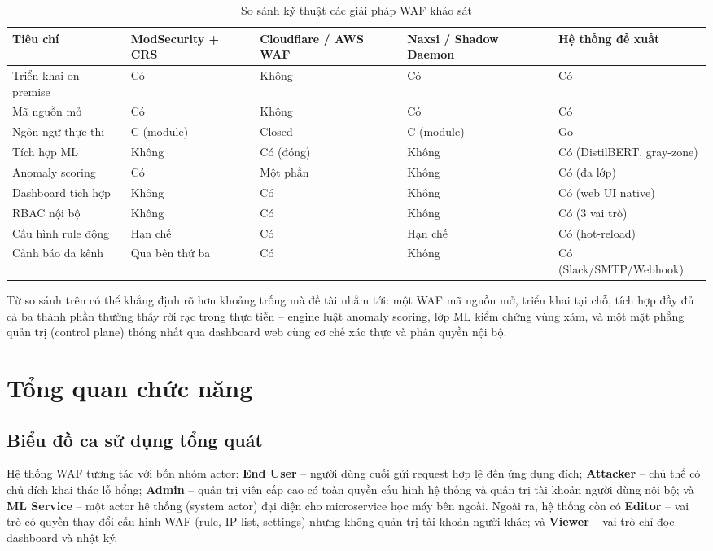 \documentclass[../DoAn.tex]{subfiles}
\begin{document}
\begin{table}[h!]
\centering
\caption{So sánh kỹ thuật các giải pháp WAF khảo sát}
\label{table:waf-comparison}
\small
\begin{tabular}{|p{3.0cm}|p{1.8cm}|p{2.5cm}|p{2.3cm}|p{2.3cm}|}
\hline
\textbf{Tiêu chí} & \textbf{ModSecurity + CRS} & \textbf{Cloudflare / AWS WAF} & \textbf{Naxsi / Shadow Daemon} & \textbf{Hệ thống đề xuất} \\
\hline
Triển khai on-premise & Có & Không & Có & Có \\
\hline
Mã nguồn mở & Có & Không & Có & Có \\
\hline
Ngôn ngữ thực thi & C (module) & Closed & C (module) & Go \\
\hline
Tích hợp ML & Không & Có (đóng) & Không & Có (DistilBERT, gray-zone) \\
\hline
Anomaly scoring & Có & Một phần & Không & Có (đa lớp) \\
\hline
Dashboard tích hợp & Không & Có & Không & Có (web UI native) \\
\hline
RBAC nội bộ & Không & Có & Không & Có (3 vai trò) \\
\hline
Cấu hình rule động & Hạn chế & Có & Hạn chế & Có (hot-reload) \\
\hline
Cảnh báo đa kênh & Qua bên thứ ba & Có & Không & Có (Slack/SMTP/Webhook) \\
\hline
\end{tabular}
\end{table}

Từ so sánh trên có thể khẳng định rõ hơn khoảng trống mà đề tài nhắm tới: một
WAF mã nguồn mở, triển khai tại chỗ, tích hợp đầy đủ cả ba thành phần thường
thấy rời rạc trong thực tiễn -- engine luật anomaly scoring, lớp ML kiểm chứng
vùng xám, và một mặt phẳng quản trị (control plane) thống nhất qua dashboard
web cùng cơ chế xác thực và phân quyền nội bộ.

\section{Tổng quan chức năng}
\label{section:2.2}

\subsection{Biểu đồ ca sử dụng tổng quát}
\label{subsection:2.2.1}

Hệ thống WAF tương tác với bốn nhóm actor: \textbf{End User} -- người dùng cuối
gửi request hợp lệ đến ứng dụng đích; \textbf{Attacker} -- chủ thể có chủ đích
khai thác lỗ hổng; \textbf{Admin} -- quản trị viên cấp cao có toàn quyền cấu
hình hệ thống và quản trị tài khoản người dùng nội bộ; và \textbf{ML Service}
-- một actor hệ thống (system actor) đại diện cho microservice học máy bên
ngoài. Ngoài ra, hệ thống còn có \textbf{Editor} -- vai trò có quyền thay đổi
cấu hình WAF (rule, IP list, settings) nhưng không quản trị tài khoản người
khác; và \textbf{Viewer} -- vai trò chỉ đọc dashboard và nhật ký.
\end{document}
